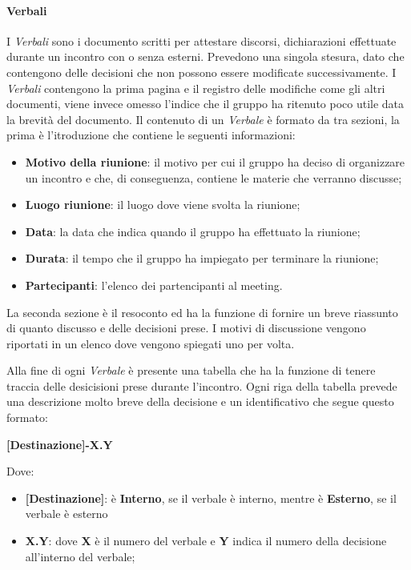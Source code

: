 \paragraph{Verbali}
I \textit{Verbali} sono i documento scritti per attestare discorsi, dichiarazioni effettuate durante un incontro con o senza esterni. Prevedono una singola stesura, dato che contengono delle decisioni che non possono essere modificate successivamente. I \textit{Verbali} contengono la prima pagina e il registro delle modifiche come gli altri documenti, viene invece omesso l'indice che il gruppo ha ritenuto poco utile data la brevità del documento. Il contenuto di un \textit{Verbale} è formato da tra sezioni, la prima è l'itroduzione che contiene le seguenti informazioni:
\begin{itemize}
	
	\item \textbf{Motivo della riunione}: il motivo per cui il gruppo ha deciso di organizzare un incontro e che, di conseguenza, contiene le materie che verranno discusse;
	
	\item \textbf{Luogo riunione}: il luogo dove viene svolta la riunione;
	
	\item \textbf{Data}: la data che indica quando il gruppo ha effettuato la riunione;
	
	\item \textbf{Durata}: il tempo che il gruppo ha impiegato per terminare la riunione;
	
	\item \textbf{Partecipanti}: l'elenco dei partencipanti al meeting.
\end{itemize}

La seconda sezione è il resoconto ed ha la funzione di fornire un breve riassunto di quanto discusso e delle decisioni prese. I motivi di discussione vengono riportati in un elenco dove vengono spiegati uno per volta.

Alla fine di ogni \textit{Verbale} è presente una tabella che ha la funzione di tenere traccia delle desicisioni prese durante l'incontro. Ogni riga della tabella prevede una descrizione molto breve della decisione e un identificativo che segue questo formato:
\begin{center}
\textbf{[Destinazione]-X.Y}
\end{center}
Dove: 

\begin{itemize}

	\item \textbf{[Destinazione]}: è \textbf{Interno}, se il verbale è interno, mentre è \textbf{Esterno}, se il verbale è esterno
	
	\item \textbf{X.Y}: dove \textbf{X} è il numero del verbale e \textbf{Y} indica il numero della decisione all'interno del verbale;
\end{itemize}

